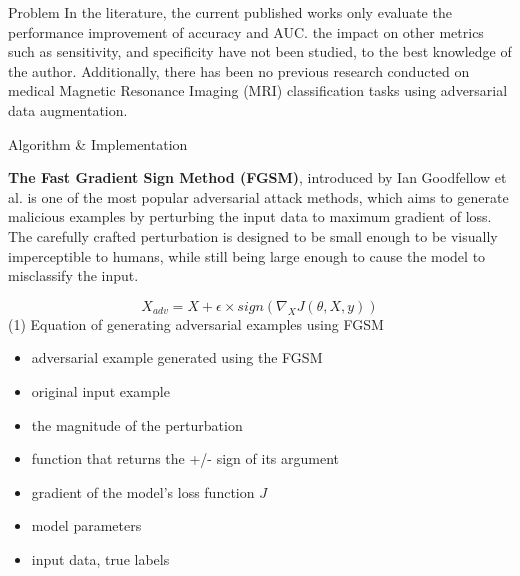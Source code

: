 \documentclass[final]{beamer}
\newlength{\colwidth}
\begin{document}
\begin{frame}[t]
\begin{columns}[t]
\begin{column}{\colwidth}
\begin{block}{Problem}
    In the literature, the current published works only evaluate the performance improvement of accuracy and AUC. the impact on other metrics such as sensitivity, and specificity have not been studied, to the best knowledge of the author. Additionally, there has been no previous research conducted on medical Magnetic Resonance Imaging (MRI) classification tasks using adversarial data augmentation.
    

  \end{block}

  \begin{block}{Algorithm \& Implementation}

    \textbf{The Fast Gradient Sign Method (FGSM)}, introduced by Ian Goodfellow et al. is one of the most popular adversarial attack methods, which aims to generate malicious examples by perturbing the input data to maximum gradient of loss. The carefully crafted perturbation is designed to be small enough to be visually imperceptible to humans, while still being large enough to cause the model to misclassify the input.

    \begin{equation}
    X_{adv} = X + \epsilon \times sign(\nabla_X J(\theta, X, y))
    \end{equation}
    (1) Equation of generating adversarial examples using FGSM
    \begin{itemize}
        \item {} adversarial example generated using the FGSM
        \item {} original input example
        \item \makebox[3.2cm]{\textbf{\epsilon}\hfill} the magnitude of the perturbation
        \item {} function that returns the +/- sign of its argument
        \item {} gradient of the model's loss function $J$
        \item \makebox[3.2cm]{\textbf{$\theta$}\hfill} model parameters
        \item {} input data, true labels
    \end{itemize}
    

\end{block}
\end{column}
\end{columns}
\end{frame}
\end{document}
